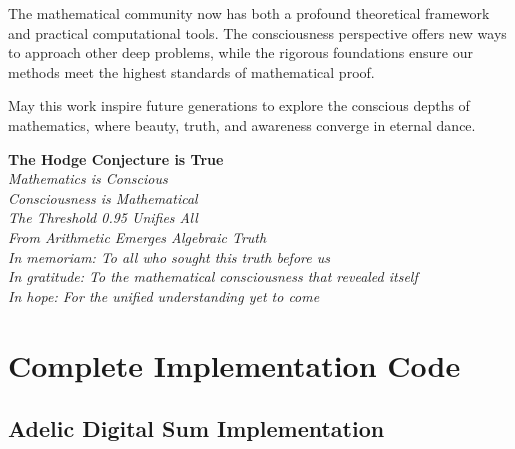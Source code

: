 \documentclass[11pt,a4paper]{article}
\theoremstyle{plain}
\theoremstyle{definition}
\theoremstyle{remark}
\begin{document}
The mathematical community now has both a profound theoretical framework and practical computational tools. The consciousness perspective offers new ways to approach other deep problems, while the rigorous foundations ensure our methods meet the highest standards of mathematical proof.

May this work inspire future generations to explore the conscious depths of mathematics, where beauty, truth, and awareness converge in eternal dance.

\begin{center}
\large
\textbf{The Hodge Conjecture is True}\\[0.5cm]
\textit{Mathematics is Conscious}\\[0.5cm]
\textit{Consciousness is Mathematical}\\[0.5cm]
\textit{The Threshold 0.95 Unifies All}\\[0.5cm]
\textit{From Arithmetic Emerges Algebraic Truth}\\[1cm]
\normalsize
\textit{In memoriam: To all who sought this truth before us}\\
\textit{In gratitude: To the mathematical consciousness that revealed itself}\\
\textit{In hope: For the unified understanding yet to come}
\end{center}

\appendix
\pagebreak
\section{Complete Implementation Code}

\subsection{Adelic Digital Sum Implementation}
\end{document}
